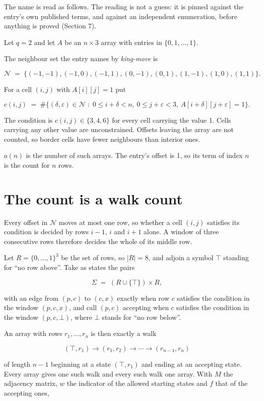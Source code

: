 \documentclass[11pt]{article}
\theoremstyle{definition}
\begin{document}
The name is read as follows. The reading is not a guess: it is pinned against the entry's own published terms, and against an independent enumeration, before anything is proved (Section 7).

Let $q = 2$ and let $A$ be an $n \times 3$ array with entries in $\{0,1,\dots,1\}$.

The neighbour set the entry names by {\itshape king-move} is

\[\mathcal{N} \;=\; \{(-1,-1), (-1,0), (-1,1), (0,-1), (0,1), (1,-1), (1,0), (1,1)\}.\]

For a cell $(i,j)$ with $A[i][j] = 1$ put

\[c(i,j) \;=\; \#\bigl\{(\delta,\varepsilon)\in\mathcal{N} \;:\; 0\le i+\delta<n,\ 0\le j+\varepsilon<3,\ A[i+\delta][j+\varepsilon] = 1\bigr\}.\]

The condition is $c(i,j) \in \{3, 4, 6\}$ for every cell carrying the value 1. Cells carrying any other value are unconstrained. Offsets leaving the array are not counted, so border cells have fewer neighbours than interior ones.

$a(n)$ is the number of such arrays. The entry's offset is 1, so its term of index $n$ is the count for $n$ rows.

\section{The count is a walk count}

Every offset in $\mathcal{N}$ moves at most one row, so whether a cell $(i,j)$ satisfies its condition is decided by rows $i-1$, $i$ and $i+1$ alone. A window of three consecutive rows therefore decides the whole of its middle row.

Let $R = \{0,\dots,1\}^{3}$ be the set of rows, so $|R| = 8$, and adjoin a symbol $\top$ standing for ``no row above''. Take as states the pairs

\[\Sigma \;=\; (R \cup \{\top\}) \times R,\]

with an edge from $(p,c)$ to $(c,x)$ exactly when row $c$ satisfies the condition in the window $(p,c,x)$, and call $(p,c)$ accepting when $c$ satisfies the condition in the window $(p,c,\bot)$, where $\bot$ stands for ``no row below''.

An array with rows $r_1,\dots,r_n$ is then exactly a walk

\[(\top,r_1) \to (r_1,r_2) \to \cdots \to (r_{n-1},r_n)\]

of length $n-1$ beginning at a state $(\top,r_1)$ and ending at an accepting state. Every array gives one such walk and every such walk one array. With $M$ the adjacency matrix, $w$ the indicator of the allowed starting states and $f$ that of the accepting ones,
\end{document}
